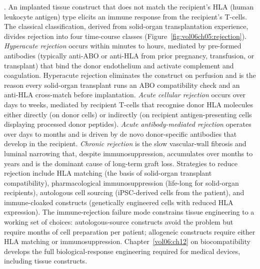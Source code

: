 . An implanted tissue construct that does
not match the recipient's HLA (human leukocyte antigen) type elicits
an immune response from the recipient's T-cells. The classical
classification, derived from solid-organ transplantation experience,
divides rejection into four time-course classes
(Figure~\ref{fig:vol06ch05:rejection}). \emph{Hyperacute rejection}
occurs within minutes to hours, mediated by pre-formed antibodies
(typically anti-ABO or anti-HLA from prior pregnancy, transfusion,
or transplant) that bind the donor endothelium and activate
complement and coagulation. Hyperacute rejection
eliminates the construct on perfusion and is the reason every
solid-organ transplant runs an ABO compatibility check and an
anti-HLA cross-match before implantation. \emph{Acute cellular
rejection} occurs over days to weeks, mediated by recipient T-cells
that recognise donor HLA molecules either directly (on donor cells)
or indirectly (on recipient antigen-presenting cells displaying
processed donor peptides). \emph{Acute antibody-mediated rejection}
operates over days to months and is driven by de novo
donor-specific antibodies that develop in the recipient. \emph{Chronic
rejection} is the slow vascular-wall fibrosis and luminal narrowing
that, despite immunosuppression, accumulates over months to years
and is the dominant cause of long-term graft loss. Strategies to
reduce rejection include HLA matching (the basis of solid-organ
transplant compatibility), pharmacological immunosuppression
(life-long for solid-organ recipients), autologous cell sourcing
(iPSC-derived cells from the patient), and immune-cloaked
constructs (genetically engineered cells with reduced HLA expression).
The immune-rejection failure mode constrains tissue engineering to a
working set of choices: autologous-source constructs avoid the
problem but require months of cell preparation per patient;
allogeneic constructs require either HLA matching or
immunosuppression. Chapter~\ref{vol06:ch12} on biocompatibility
develops the full biological-response engineering required for
medical devices, including tissue constructs.



